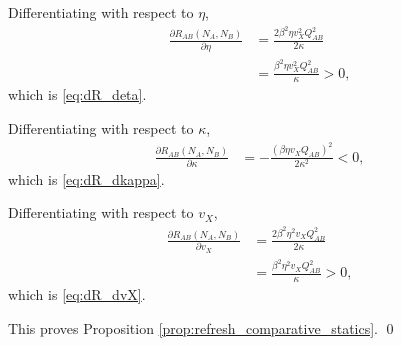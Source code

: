 Differentiating with respect to $\eta$,
\begin{align}
\frac{\partial R_{AB}(N_A,N_B)}{\partial \eta}
&=
\frac{2\beta^2\eta v_X^2Q_{AB}^2}{2\kappa}
\nonumber\\
&=
\frac{\beta^2\eta v_X^2Q_{AB}^2}{\kappa}
>0,
\label{eq:app6_dR_deta}
\end{align}
which is \eqref{eq:dR_deta}.

Differentiating with respect to $\kappa$,
\begin{align}
\frac{\partial R_{AB}(N_A,N_B)}{\partial \kappa}
&=
-\frac{(\beta\eta v_XQ_{AB})^2}{2\kappa^2}
<0,
\label{eq:app6_dR_dkappa}
\end{align}
which is \eqref{eq:dR_dkappa}.

Differentiating with respect to $v_X$,
\begin{align}
\frac{\partial R_{AB}(N_A,N_B)}{\partial v_X}
&=
\frac{2\beta^2\eta^2v_XQ_{AB}^2}{2\kappa}
\nonumber\\
&=
\frac{\beta^2\eta^2v_XQ_{AB}^2}{\kappa}
>0,
\label{eq:app6_dR_dvX}
\end{align}
which is \eqref{eq:dR_dvX}.

This proves Proposition \ref{prop:refresh_comparative_statics}.
\qed
